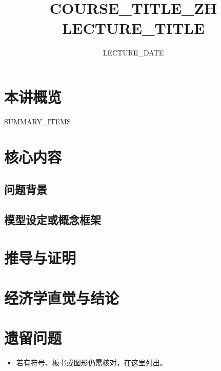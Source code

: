 \documentclass[UTF8,11pt,a4paper]{ctexart}
\title{ {{COURSE_TITLE_ZH}} \\ \large {{LECTURE_TITLE}} }
\author{}
\date{{{LECTURE_DATE}}}
\begin{document}
\maketitle

\section{本讲概览}

\begin{itemize}
{{SUMMARY_ITEMS}}
\end{itemize}

\section{核心内容}


\subsection{问题背景}


\subsection{模型设定或概念框架}


\section{推导与证明}


\section{经济学直觉与结论}


\section{遗留问题}

\begin{itemize}
  \item 若有符号、板书或图形仍需核对，在这里列出。
\end{itemize}
\end{document}
